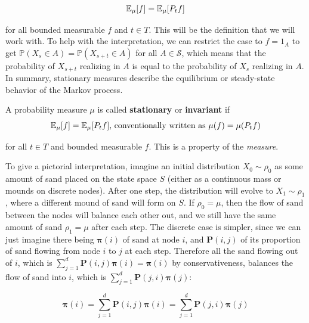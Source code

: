 	\begin{equation}
		\operatorname{\mathbb{E}}_\mu [f] = \operatorname{\mathbb{E}}_\mu [P_t f]
	\end{equation}

	for all bounded measurable $f$ and $t \in T$. This will be the definition that we will work with. To help with the interpretation, we can restrict the case to $f = 1_A$ to get $\mathbb{P}(X_s \in A) = \mathbb{P}(X_{s + t} \in A)$ for all $A \in \mathcal{S}$, which means that the probability of $X_{s + t}$ realizing in $A$ is equal to the probability of $X_s$ realizing in $A$. In summary, stationary measures describe the equilibrium or steady-state behavior of the Markov process.  

	\begin{definition}
		\label{def:stationary-measure}
		A probability measure $\mu$ is called \textbf{stationary} or \textbf{invariant} if 
		\begin{equation}
			\operatorname{\mathbb{E}}_\mu[f] = \operatorname{\mathbb{E}}_\mu [P_t f] \text{, conventionally written as } \mu(f) = \mu(P_t f)
		\end{equation}

		for all $t \in T$ and bounded measurable $f$. This is a property of the \textit{measure}. 
	\end{definition}

	To give a pictorial interpretation, imagine an initial distribution $X_0 \sim \rho_0$ as some amount of sand placed on the state space $S$ (either as a continuous mass or mounds on discrete nodes). After one step, the distribution will evolve to $X_1 \sim \rho_1$, where a different mound of sand will form on $S$. If $\rho_0 = \mu$, then the flow of sand between the nodes will balance each other out, and we still have the same amount of sand $\rho_1 = \mu$ after each step. The discrete case is simpler, since we can just imagine there being $\boldsymbol{\pi} (i)$ of sand at node $i$, and $\mathbf{P} (i, j)$ of its proportion of sand flowing from node $i$ to $j$ at each step. Therefore all the sand flowing out of $i$, which is $\sum_{j=1}^d \mathbf{P}(i, j) \boldsymbol{\pi}(i) = \boldsymbol{\pi}(i)$ by conservativeness, balances the flow of sand into $i$, which is $\sum_{j=1}^d \mathbf{P}(j, i) \boldsymbol{\pi}(j)$:

		\begin{equation}
			\boldsymbol{\pi}(i) = \sum_{j=1}^d \mathbf{P}(i, j) \boldsymbol{\pi}(i) = \sum_{j=1}^d \mathbf{P}(j, i) \boldsymbol{\pi}(j)
		\end{equation}

